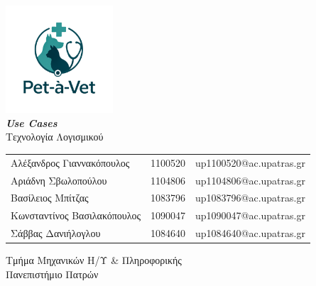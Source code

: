 \documentclass[12pt,a4paper,twoside]{book}
\begin{document}
\let\cleardoublepage\clearpage


\begin{titlepage}
  \vspace*{5cm}
  \begin{center}
    \includegraphics[width=0.3\textwidth]{../Resources/Pet-a-vet-logo-transparent.png}\\
    \vspace*{0.5cm}
    {\large \textbf{\textit{Use Cases}}}\\
    {\large Τεχνολογία Λογισμικού}
    \vspace*{5cm}
    \\
    \vspace*{1cm}
    \begin{tabular}{l l l}
      \large Αλέξανδρος Γιαννακόπουλος   & \large 1100520 & \large up1100520@ac.upatras.gr \\ %
      \large Αριάδνη Σβωλοπούλου         & \large 1104806 & \large up1104806@ac.upatras.gr \\ %
      \large Βασίλειος Μπίτζας           & \large 1083796 & \large up1083796@ac.upatras.gr \\
      \large Κωνσταντίνος Βασιλακόπουλος & \large 1090047 & \large up1090047@ac.upatras.gr \\
      \large Σάββας Δανιήλογλου          & \large 1084640 & \large up1084640@ac.upatras.gr
    \end{tabular}

    \vspace*{1cm}

    {\normalsize Τμήμα Μηχανικών Η/Υ \& Πληροφορικής}
    \\
    {\normalsize Πανεπιστήμιο Πατρών}
    \\
  \end{center}
  \thispagestyle{empty} %
\end{titlepage}
\end{document}
